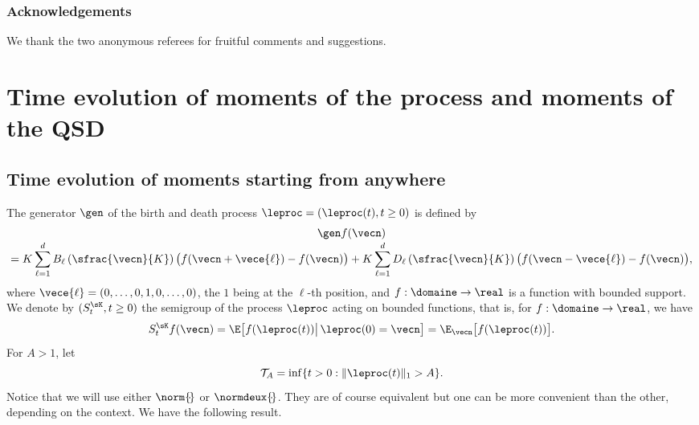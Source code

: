 \subsubsection*{Acknowledgements}
We thank the two anonymous referees for fruitful comments and suggestions.

\section{Time evolution of moments of the process and moments of the QSD}
\label{moment-process}

\subsection{Time evolution of moments starting from anywhere}
The generator $\gen$ of the birth and death process $\leproc=(\leproc(t),t\geq 0)$ is defined by
\begin{multline}\label{gene}
\gen f(\vecn)\\[-3pt]
= K\sum_{\ell=1}^{d}B_{\ell}\left(\sfrac{\vecn}{K}\right)\bigl(f(\vecn+\vece{\ell})-f(\vecn)\bigr)
+K\sum_{\ell=1}^{d}D_{\ell}\left(\sfrac{\vecn}{K}\right)\bigl(f(\vecn-\vece{\ell})-f(\vecn)\bigr),
\end{multline}
where $\vece{\ell}=(0,\ldots,0,1,0,\ldots,0)$, the $1$ being
at the $\ell$-th position, and $f:\domaine\to\real$ is a function with bounded support.
We denote by $(S^{\sK}_{t},t\geq 0)$ the semigroup of the process $\leproc$ acting on bounded
functions, that is, for $f:\domaine\to\real$, we have
\[
S^{\sK}_{t}f(\vecn)
=\E\bigl[f(\leproc(t))\big|\, \leproc(0)=\vecn\bigr]
=\E_{\vecn}\bigl[f(\leproc(t))\bigr].
\]
For $A>1$, let
\begin{equation}\label{leTA}
\mathcal{T}_A=\inf\{t>0:\|\leproc(t)\|_1>A\}.
\end{equation}
Notice that we will use either $\norm{\!\hspace{-0.5pt}\cdot\!}$ or $\normdeux{\!\hspace{-0.5pt}\cdot\!}$. They are of course equivalent but one can be more convenient than the other, depending on the context.
We have the following result.

